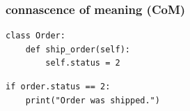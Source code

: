 \documentclass[aspectratio=169,12pt,xcolor=dvipsnames]{beamer}
\begin{document}
\begin{frame}[fragile]
  \frametitle{connascence of meaning (CoM)}
  \begin{center}
    \begin{minipage}[c]{.5\textwidth}
      \begin{verbatim}
class Order:
    def ship_order(self):
        self.status = 2
      \end{verbatim}
    \end{minipage}
    \begin{minipage}[c]{.5\textwidth}
      \begin{verbatim}
if order.status == 2:
    print("Order was shipped.")
      \end{verbatim}
    \end{minipage}
  \end{center}
\end{frame}


\end{document}
